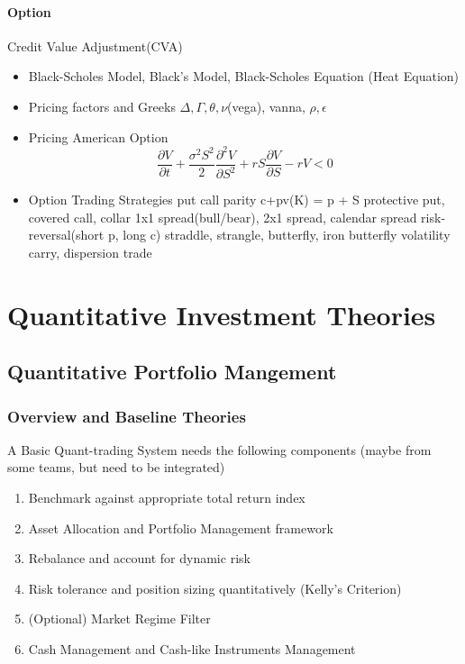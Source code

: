 \documentclass[11pt, openany]{book}              %
\begin{document}
\subsection{Option}

Credit Value Adjustment(CVA)
 \begin{itemize}
    \item Black-Scholes Model, Black's Model, Black-Scholes Equation (Heat Equation)
    \item Pricing factors and Greeks $\Delta,\Gamma, \theta, \nu$(vega), vanna, $\rho,\epsilon$ 
    \item Pricing American Option
    $$\frac{\partial V}{\partial t} + \frac{\sigma^2 S^2}{2} \frac{\partial^2 V}{\partial S^2}+ r S \frac{\partial V}{\partial S} - rV < 0 $$
    \item Option Trading Strategies
     \subitem put call parity c+pv(K) = p + S
     \subitem protective put, covered call, collar
     \subitem 1x1 spread(bull/bear), 2x1 spread, calendar spread
     \subitem risk-reversal(short p, long c)
     \subitem straddle, strangle, butterfly, iron butterfly
     \subitem volatility carry, dispersion trade
\end{itemize}



\part{Quantitative Investment Theories}

\chapter{Quantitative Portfolio Mangement}


\section{Overview and Baseline Theories}

A Basic Quant-trading System needs the following components (maybe from some teams, but need to be integrated)

\begin{enumerate}
\item Benchmark against appropriate total return index
\item Asset Allocation and Portfolio Management	framework
\item Rebalance and account for dynamic risk 
\item Risk tolerance and position sizing quantitatively (Kelly's Criterion)
\item (Optional) Market Regime Filter 
\item Cash Management and Cash-like Instruments Management
\end{enumerate}
\end{document}
